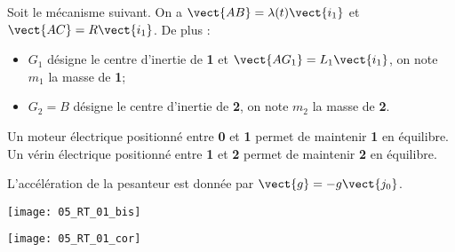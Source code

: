 \normaltrue
\correctiontrue


\setcounter{question}{0}%
\ifcorrection
\else
{}
\fi

\ifprof
\else
Soit le mécanisme suivant. On a $\vect{AB}=\lambda(t)\vect{i_1}$ et $\vect{AC}=R\vect{i_1}$. De plus :
\begin{itemize}
\item $G_1$ désigne le centre d'inertie de \textbf{1} et $\vect{AG_1}=L_1\vect{i_1}$, on note $m_1$ la masse de \textbf{1}; %
\item $G_2=B$ désigne le centre d'inertie de \textbf{2}, on note $m_2$ la masse de \textbf{2}.%
\end{itemize}


Un moteur électrique positionné entre \textbf{0} et \textbf{1} permet de maintenir \textbf{1} en équilibre.
Un vérin électrique positionné entre \textbf{1} et \textbf{2} permet de maintenir \textbf{2} en équilibre.

L'accélération de la pesanteur est donnée par $\vect{g}=-g\vect{j_0}$.

\begin{marginfigure}
\texttt{[image: 05\_RT\_01\_bis]}
\end{marginfigure}
\fi

\ifprof
\begin{marginfigure}
\texttt{[image: 05\_RT\_01\_cor]}
\end{marginfigure}

\else
\fi

